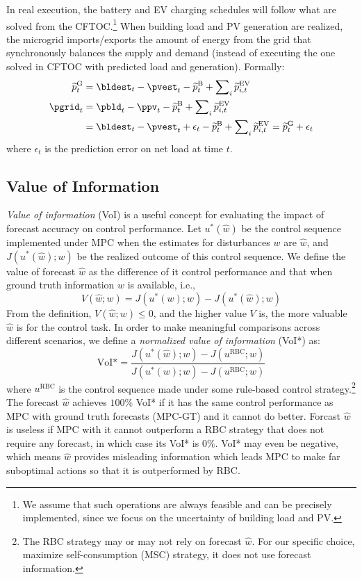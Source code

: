 In real execution, the battery and EV charging schedules will follow what are solved from the CFTOC.\footnote{We assume that such operations are always feasible and can be precisely implemented, since we focus on the uncertainty of building load and PV.} When building load and PV generation are realized, the microgrid imports/exports the amount of energy from the grid that synchronously balances the supply and demand (instead of executing the one solved in CFTOC with predicted load and generation). Formally:
\begin{subequations}
\begin{align}
    \pgridSch_t & = \bldest_t - \pvest_t - \pbattSch_t + \sum\nolimits_i \pevSch_{i,t} \label{eq:pgrid_sch}\\
    \pgrid_t & = \pbld_t - \ppv_t - \pbattSch_t + \sum\nolimits_i \pevSch_{i,t} \label{eq:pgrid_real}\\
    & = \bldest_t - \pvest_t + \epsilon_t - \pbattSch_t + \sum\nolimits_i \pevSch_{i,t}\notag
     = \pgridSch_t + \epsilon_t
\end{align}
\end{subequations}
where $\epsilon_t$ is the prediction error on net load at time $t$.


\subsection{Value of Information}

\emph{Value of information} (VoI) is a useful concept for evaluating the impact of forecast accuracy on control performance. Let $u^*(\hat{w})$ be the control sequence implemented under MPC when the estimates for disturbances $w$ are $\hat{w}$, and $J(u^*(\hat{w}); w)$ be the realized outcome of this control sequence. We define the value of forecast $\hat{w}$ as the difference of it control performance and that when ground truth information $w$ is available, i.e.,
\begin{equation}
    V(\hat{w}; w) =  J(u^*(w); w) - J(u^*(\hat{w}); w)
\end{equation}
From the definition, $V(\hat{w}; w) \le 0$, and the higher value $V$ is, the more valuable $\hat{w}$ is for the control task. In order to make meaningful comparisons across different scenarios, we define a \emph{normalized value of information} (VoI*) as:
\begin{equation}
    \text{VoI*} = \frac{J(u^*(\hat{w}); w) - J(u^{\text{RBC}}; w)}{J(u^*(w); w) - J(u^{\text{RBC}}; w)}
\end{equation}
where $u^{\text{RBC}}$ is the control sequence made under some rule-based control strategy.\footnote{The RBC strategy may or may not rely on forecast $\hat{w}$. For our specific choice, maximize self-consumption (MSC) strategy, it does not use forecast information.} The forecast $\hat{w}$ achieves $100\%$ VoI* if it has the same control performance as MPC with ground truth forecasts (MPC-GT) and it cannot do better. Forcast $\hat{w}$ is useless if MPC with it cannot outperform a RBC strategy that does not require any forecast, in which case its VoI* is $0\%$. VoI* may even be negative, which means $\hat{w}$ provides misleading information which leads MPC to make far suboptimal actions so that it is outperformed by RBC.

